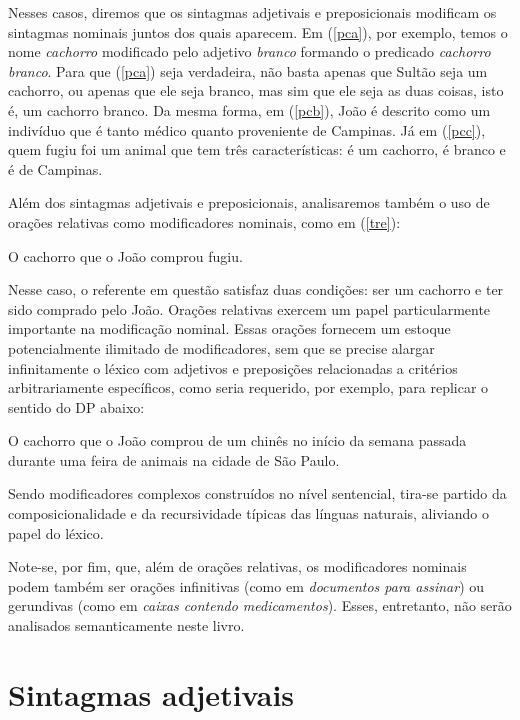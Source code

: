 \n Nesses casos, diremos que os sintagmas adjetivais e
preposicionais modificam os sintagmas nominais juntos dos quais
aparecem. Em (\ref{pca}), por exemplo, temos o nome \textit{cachorro}
modificado pelo adjetivo \textit{branco} formando o predicado \textit{cachorro branco}. Para que (\ref{pca}) seja verdadeira, não basta apenas que
Sultão seja um cachorro, ou apenas que ele seja branco, mas
sim que ele seja as duas coisas, isto é, um cachorro branco. Da
mesma forma, em (\ref{pcb}), João é descrito como um indivíduo que
é tanto médico quanto proveniente de Campinas. Já em (\ref{pcc}),
quem fugiu foi um animal que tem três características: é um
cachorro, é branco e é de Campinas.

Além dos sintagmas adjetivais e preposicionais, analisaremos
também o uso de orações relativas como modificadores nominais,
como em (\ref{tre}):

\begin{exe}
\ex O cachorro que o João comprou fugiu.\label{tre}
\end{exe}

Nesse caso, o referente em questão satisfaz duas condições: ser um cachorro e ter sido comprado pelo João. Orações relativas exercem um papel particularmente importante na modificação nominal. Essas orações fornecem um estoque potencialmente ilimitado de modificadores, sem que se precise alargar infinitamente o léxico com adjetivos e preposições relacionadas a critérios arbitrariamente específicos, como seria requerido, por exemplo, para replicar o sentido do DP abaixo:

\begin{exe}
	\ex O cachorro que o João comprou de um chinês no início da semana passada durante uma feira de animais na cidade de São Paulo.\label{ret}
\end{exe}

\n Sendo modificadores complexos construídos no nível sentencial, tira-se partido da composicionalidade e da recursividade típicas das línguas naturais, aliviando o papel do léxico. 

Note-se, por fim, que, além de orações relativas, os modificadores nominais podem também ser orações infinitivas (como em \textit{documentos para assinar}) ou gerundivas (como em \textit{caixas contendo medicamentos}). Esses, entretanto, não serão analisados semanticamente neste livro.



\section{Sintagmas adjetivais}

